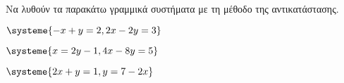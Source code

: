 Να λυθούν τα παρακάτω γραμμικά συστήματα με τη μέθοδο της αντικατάστασης.
\begin{multicols}{2}
\begin{rlist}[leftmargin=5mm]
\item $ \systeme{-x+y=2,2x-2y=3} $
\item $ \systeme{x=2y-1,4x-8y=5} $
\item $ \systeme{2x+y=1,y=7-2x} $
\end{rlist}
\end{multicols}

